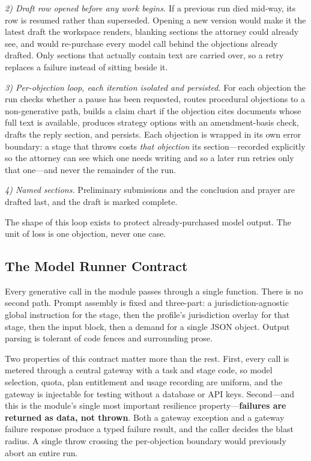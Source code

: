 \documentclass[conference]{IEEEtran}
\begin{document}
\emph{2) Draft row opened before any work begins.} If a previous run died mid-way, its row is resumed rather than superseded. Opening a new version would make it the latest draft the workspace renders, blanking sections the attorney could already see, and would re-purchase every model call behind the objections already drafted. Only sections that actually contain text are carried over, so a retry replaces a failure instead of sitting beside it.

\emph{3) Per-objection loop, each iteration isolated and persisted.} For each objection the run checks whether a pause has been requested, routes procedural objections to a non-generative path, builds a claim chart if the objection cites documents whose full text is available, produces strategy options with an amendment-basis check, drafts the reply section, and persists. Each objection is wrapped in its own error boundary: a stage that throws costs \emph{that objection} its section---recorded explicitly so the attorney can see which one needs writing and so a later run retries only that one---and never the remainder of the run.

\emph{4) Named sections.} Preliminary submissions and the conclusion and prayer are drafted last, and the draft is marked complete.

The shape of this loop exists to protect already-purchased model output. The unit of loss is one objection, never one case.

\subsection{The Model Runner Contract}

Every generative call in the module passes through a single function. There is no second path. Prompt assembly is fixed and three-part: a jurisdiction-agnostic global instruction for the stage, then the profile's jurisdiction overlay for that stage, then the input block, then a demand for a single JSON object. Output parsing is tolerant of code fences and surrounding prose.

Two properties of this contract matter more than the rest. First, every call is metered through a central gateway with a task and stage code, so model selection, quota, plan entitlement and usage recording are uniform, and the gateway is injectable for testing without a database or API keys. Second---and this is the module's single most important resilience property---\textbf{failures are returned as data, not thrown}. Both a gateway exception and a gateway failure response produce a typed failure result, and the caller decides the blast radius. A single throw crossing the per-objection boundary would previously abort an entire run.
\end{document}
